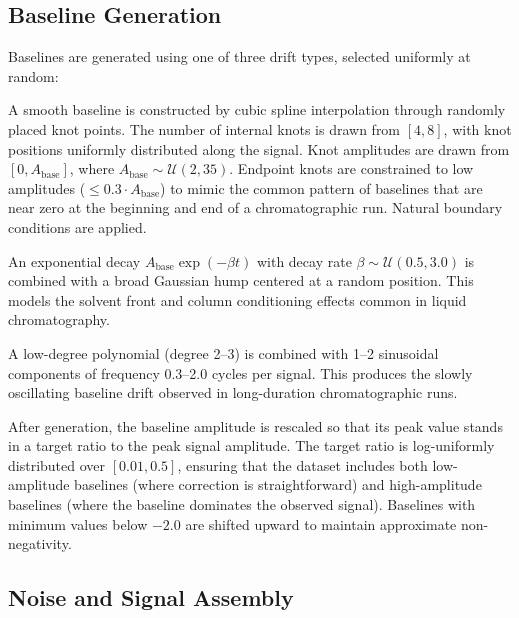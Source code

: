 \subsection{Baseline Generation}
\label{sec:exp_baseline}

Baselines are generated using one of three drift types, selected uniformly at random:

 A smooth baseline is constructed by cubic spline interpolation through randomly placed knot points. The number of internal knots is drawn from $[4, 8]$, with knot positions uniformly distributed along the signal. Knot amplitudes are drawn from $[0, A_{\text{base}}]$, where $A_{\text{base}} \sim \mathcal{U}(2, 35)$. Endpoint knots are constrained to low amplitudes ($\leq 0.3 \cdot A_{\text{base}}$) to mimic the common pattern of baselines that are near zero at the beginning and end of a chromatographic run. Natural boundary conditions are applied.

 An exponential decay $A_{\text{base}} \exp(-\beta t)$ with decay rate $\beta \sim \mathcal{U}(0.5, 3.0)$ is combined with a broad Gaussian hump centered at a random position. This models the solvent front and column conditioning effects common in liquid chromatography.

 A low-degree polynomial (degree 2--3) is combined with 1--2 sinusoidal components of frequency 0.3--2.0 cycles per signal. This produces the slowly oscillating baseline drift observed in long-duration chromatographic runs.

After generation, the baseline amplitude is rescaled so that its peak value stands in a target ratio to the peak signal amplitude. The target ratio is log-uniformly distributed over $[0.01, 0.5]$, ensuring that the dataset includes both low-amplitude baselines (where correction is straightforward) and high-amplitude baselines (where the baseline dominates the observed signal). Baselines with minimum values below $-2.0$ are shifted upward to maintain approximate non-negativity.


\subsection{Noise and Signal Assembly}
\label{sec:exp_noise}

